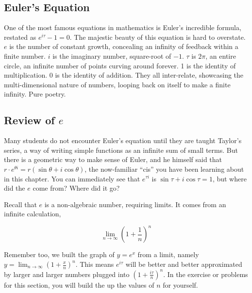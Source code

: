 
\subsection{Euler's Equation}
One of the most famous equations in mathematics is Euler's incredible formula, restated as
$e^{i\tau}-1=0$.  The majestic beauty of this equation is hard to overstate.  $e$ is the number
of constant growth, concealing an infinity of feedback within a finite number.  $i$ is the imaginary
number, square-root of $-1$.  $\tau$ is $2\pi$, an entire circle, an infinite number of points curving
around forever.  1 is the identity of multiplication.  0 is the identity of addition.  They all inter-relate,
showcasing the multi-dimensional nature of numbers, looping back on itself to make a finite
infinity.  Pure poetry.

\subsection{Review of $e$}
Many students do not encounter Euler's equation until they are taught Taylor's series, a way of 
writing simple functions as an infinite sum of small terms.  But there is a geometric way to make
sense of Euler, and he himself said that $r\cdot e^{\theta i}=r(\sin{\theta}+i\cos{\theta})$, the now-familiar
``cis'' you have been learning about in this chapter.  You can immediately see that $e^{\tau i}$ is
$\sin{\tau}+i\cos{\tau}=1$, but where did the $e$ come from?  Where did it go?

Recall that $e$ is a non-algebraic number, requiring limits.  It comes from an infinite calculation,

$$\lim_{n\rightarrow\infty} \left(1+\frac{1}{n}\right)^n$$

Remember too, we built the graph of $y=e^x$ from a limit, namely $y=\lim_{n\rightarrow\infty}(1+\frac{x}{n})^n$.  This means $e^{i\tau}$ will be better and better approximated by larger and larger numbers
plugged into $(1+\frac{i\tau}{n})^n$.  In the exercise or problems for this section, you will build the up
the values of $n$ for yourself.



